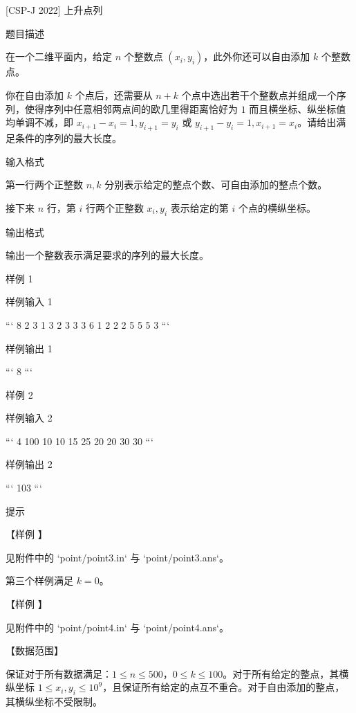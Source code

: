 \documentclass[12pt,twiside,a4paper]{ctexbook}
\numberwithin{chapter}{part}
\begin{document}
\section{}
 [CSP-J 2022] 上升点列

 题目描述

在一个二维平面内，给定 $n$ 个整数点 $(x_i, y_i)$，此外你还可以自由添加 $k$ 个整数点。

你在自由添加 $k$ 个点后，还需要从 $n + k$ 个点中选出若干个整数点并组成一个序列，使得序列中任意相邻两点间的欧几里得距离恰好为 $1$ 而且横坐标、纵坐标值均单调不减，即 $x_{i+1} - x_i = 1, y_{i+1} = y_i$ 或 $y_{i+1} - y_i = 1, x_{i+1} = x_i$。请给出满足条件的序列的最大长度。

 输入格式

第一行两个正整数 $n, k$ 分别表示给定的整点个数、可自由添加的整点个数。

接下来 $n$ 行，第 $i$ 行两个正整数 $x_i, y_i$ 表示给定的第 $i$ 个点的横纵坐标。

 输出格式

输出一个整数表示满足要求的序列的最大长度。

 样例 1

 样例输入 1

```
8 2
3 1
3 2
3 3
3 6
1 2
2 2
5 5
5 3
```

 样例输出 1

```
8
```

 样例 2

 样例输入 2

```
4 100
10 10
15 25
20 20
30 30
```

 样例输出 2

```
103
```

 提示

【样例 】

见附件中的 `point/point3.in` 与 `point/point3.ans`。

第三个样例满足 $k = 0$。

【样例 】

见附件中的 `point/point4.in` 与 `point/point4.ans`。

【数据范围】

保证对于所有数据满足：$1 \leq n \leq 500$，$0 \leq k \leq 100$。对于所有给定的整点，其横纵坐标 $1 \leq x_i, y_i \leq {10}^9$，且保证所有给定的点互不重合。对于自由添加的整点，其横纵坐标不受限制。
\end{document}
